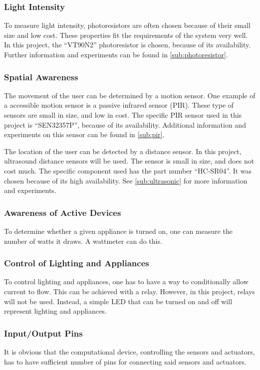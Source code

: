 \subsubsection{Light Intensity}
To measure light intensity, photoresistors are often chosen because of their small size and low cost. These properties fit the requirements of the system very well. In this project, the \enquote{VT90N2} photoresistor is chosen, because of its availability. Further information and experiments can be found in \cref{sub:photoresistor}.

\subsubsection{Spatial Awareness}
The movement of the user can be determined by a motion sensor. One example of a accessible motion sensor is a passive infrared sensor (PIR). These type of sensors are small in size, and low in cost. The specific PIR sensor used in this project is \enquote{SEN32357P}, because of its availability. Additional information and experiments on this sensor can be found in \cref{sub:pir}.

The location of the user can be detected by a distance sensor. In this project, ultrasound distance sensors will be used. The sensor is small in size, and does not cost much. The specific component used has the part number \enquote{HC-SR04}. It was chosen because of its high availability. See \cref{sub:ultrasonic} for more information and experiments.

\subsubsection{Awareness of Active Devices}
To determine whether a given appliance is turned on, one can measure the number of watts it draws. A wattmeter can do this.

\subsubsection{Control of Lighting and Appliances}
To control lighting and appliances, one has to have a way to conditionally allow current to flow. This can be achieved with a relay. However, in this project, relays will not be used. Instead, a simple LED that can be turned on and off will represent lighting and appliances.

\subsubsection{Input/Output Pins}
It is obvious that the computational device, controlling the sensors and actuators, has to have sufficient number of pins for connecting said sensors and actuators.

